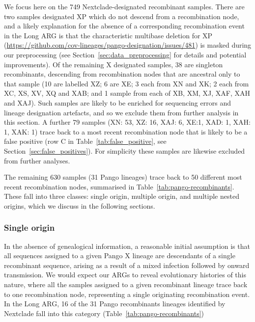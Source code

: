 \documentclass{article}
\begin{document}
We focus here on the 749 Nextclade-designated recombinant samples.
There are two samples designated XP which do not descend from a recombination node,
and a likely explanation for the absence of a corresponding recombination event
in the Long ARG is that the characteristic multibase deletion for XP
(\url{https://github.com/cov-lineages/pango-designation/issues/481}) is masked
during our preprocessing (see Section~\ref{sec:data_preprocessing} for details and potential
improvements). Of the remaining X designated samples, 38 are singleton recombinants,
descending from recombination nodes that are ancestral only to that sample
(10 are labelled XZ; 6 are XE;  3 each from XN and XK; 2 each from XC, XS, XV, XQ and XAB;
and 1 sample from each of XB, XM, XJ, XAF, XAH and XAJ). Such samples are likely to
be enriched for sequencing errors and lineage designation artefacts, and so we
exclude them from further analysis in this section. A further 79 samples
(XN: 53, XZ: 16, XAJ: 6, XE:1, XAD: 1, XAH: 1, XAK: 1) trace back
to a most recent recombination node that is likely to be a false positive
(row C in Table~\ref{tab:false_positive}, see Section~\ref{sec:false_positives}).
For simplicity these samples are likewise excluded from further analyses.

The remaining 630 samples (31 Pango lineages) trace back to 50 different
most recent recombination nodes, summarised
in Table~\ref{tab:pango-recombinants}.
These fall into three classes: single origin, multiple origin,
and multiple nested origins, which we discuss in the following sections.

\subsubsection{Single origin}
In the absence of genealogical information, a reasonable initial assumption is
that all sequences
assigned to a given Pango X lineage are descendants of a single recombinant
sequence, arising as a result of a mixed infection followed by onward
transmission. We would expect our ARGs to reveal evolutionary histories of this
nature, where all the samples assigned to a given recombinant lineage
trace back to one recombination node, representing a single originating
recombination event. In the Long ARG, 16 of the 31 Pango recombinants lineages identified by Nextclade
fall into this category (Table~\ref{tab:pango-recombinants})
\end{document}
